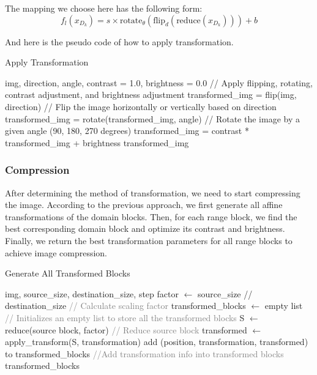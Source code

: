 \documentclass{article}
\begin{document}
The mapping we choose here has the following form:
\[
f_l (x_{D_k}) = s \times \text{rotate}_\theta (\text{flip}_d (\text{reduce}(x_{D_k}))) + b
\]

And here is the pseudo code of how to apply transformation.
\begin{algorithm}
\caption{Apply Transformation}
\begin{algorithmic}[1]
\REQUIRE img, direction, angle, contrast = 1.0, brightness = 0.0
\STATE // Apply flipping, rotating, contrast adjustment, and brightness adjustment
\STATE transformed\_img = flip(img, direction)
\STATE // Flip the image horizontally or vertically based on direction
\STATE transformed\_img = rotate(transformed\_img, angle)
\STATE // Rotate the image by a given angle (90, 180, 270 degrees)
\STATE transformed\_img = contrast * transformed\_img + brightness
\RETURN transformed\_img
\end{algorithmic}
\end{algorithm}


\subsubsection{Compression}
After determining the method of transformation, we need to start compressing the image. According to the previous approach, we first generate all affine transformations of the domain blocks. Then, for each range block, we find the best corresponding domain block and optimize its contrast and brightness. Finally, we return the best transformation parameters for all range blocks to achieve image compression.

\begin{algorithm}
\caption{Generate All Transformed Blocks}
\begin{algorithmic}[1]
\REQUIRE img, source\_size, destination\_size, step
\STATE factor $\gets$ source\_size // destination\_size \textcolor{gray}{// Calculate scaling factor}
\STATE transformed\_blocks $\gets$ empty list \textcolor{gray}{// Initializes an empty list to store all the transformed blocks}
    \STATE S $\gets$ reduce(source block, factor) \textcolor{gray}{// Reduce source block}
        \STATE transformed $\gets$ apply\_transform(S, transformation) %
        \STATE add (position, transformation, transformed) to transformed\_blocks \textcolor{gray}{//Add transformation info into transformed blocks}
    \ENDFOR
\ENDFOR
\RETURN transformed\_blocks
\end{algorithmic}
\end{algorithm}
\end{document}

